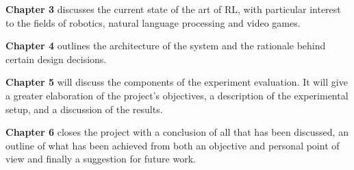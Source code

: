 \textbf{Chapter 3} discusses the current state of the art of RL, with particular interest to the fields of robotics, natural language processing and video games.

\textbf{Chapter 4} outlines the architecture of the system and the rationale behind certain design decisions.

\textbf{Chapter 5} will discuss the components of the experiment evaluation. It will give a greater elaboration of the project's objectives, a description of the experimental setup, and a discussion of the results.

\textbf{Chapter 6} closes the project with a conclusion of all that has been discussed, an outline of what has been achieved from both an objective and personal point of view and finally a suggestion for future work.
